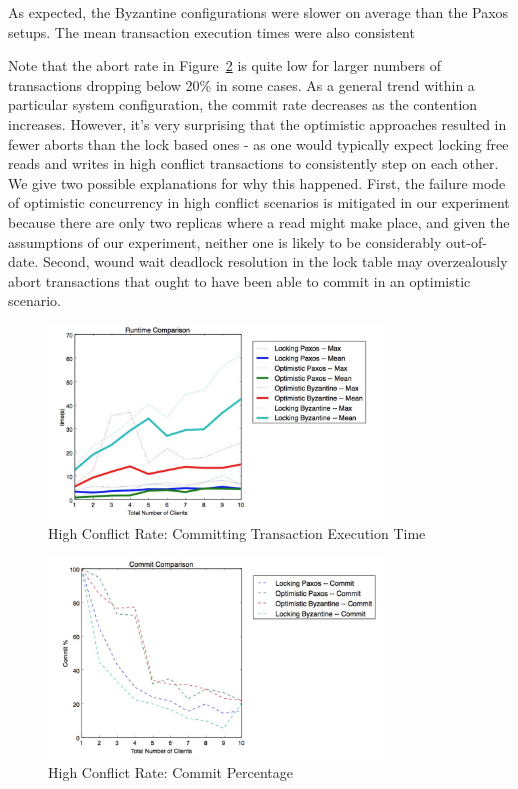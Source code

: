 \documentclass[10pt,twocolumn]{article}
\begin{document}
As expected, the Byzantine configurations were slower on average than the Paxos setups. The mean transaction execution times were also consistent 

Note that the abort rate in Figure~\ref{1-commit} is quite low for larger numbers of transactions dropping below 20\% in some cases. As a general trend within a particular system configuration, the commit rate decreases as the contention increases. However, it's very surprising that the optimistic approaches resulted in fewer aborts than the lock based ones - as one would typically expect locking free reads and writes in high conflict transactions to consistently step on each other. We give two possible explanations for why this happened. First, the failure mode of optimistic concurrency in high conflict scenarios is mitigated in our experiment because there are only two replicas where a read might make place, and given the assumptions of our experiment, neither one is likely to be considerably out-of-date. Second, wound wait deadlock resolution in the lock table may overzealously abort transactions that ought to have been able to commit in an optimistic scenario.

\begin{figure}[!b]
  \begin{center}
    \includegraphics[width=3.5in]{Images/1-time.png}
  \end{center}

  \caption{\small High Conflict Rate: Committing Transaction Execution Time }
  \label{1-time}
\end{figure}

\begin{figure}[!b]
  \begin{center}
    \includegraphics[width=3.5in]{Images/1-commit.png}
  \end{center}

  \caption{\small High Conflict Rate: Commit Percentage }
  \label{1-commit}
\end{figure}
\end{document}
